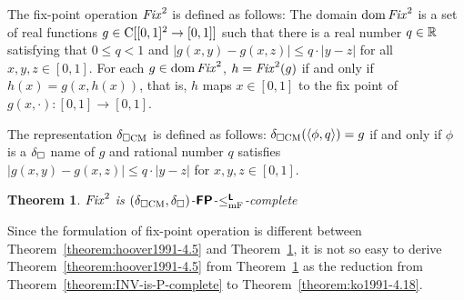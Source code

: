 \documentclass{article}
\newtheorem{theorem}{Theorem}[section]
\theoremstyle{definition}
\theoremstyle{remark}
\begin{document}
The fix-point operation $\mathit{Fix}^2$ is defined as follows:
The domain $\mathop{\rm dom} \mathit{Fix}^2$ is a set of real functions 
$g \in \mathrm C[[0,1]^2 \to [0,1]]$ such that there is a real number $q \in \mathbb R$
satisfying that $0 \le q < 1$ and $|g(x, y) - g(x, z)| \le q \cdot |y - z|$
for all $x, y, z \in [0,1]$.
For each $g \in \mathop{\rm dom} \mathit{Fix}^2$, $h = \mathit{Fix}^2(g)$ if and only if 
$h(x) = g(x, h(x))$, that is, $h$ maps $x \in [0,1]$ to the fix point of $g(x, \cdot) \colon [0,1] \to [0,1]$.

The representation $\delta _{\square \mathrm{CM}}$ is defined as follows:
$\delta _{\square \mathrm{CM}}(\langle \phi, q \rangle) = g$ if and only if
$\phi$ is a $\delta _\square$ name of $g$ and rational number $q$ satisfies 
$|g(x, y) - g(x, z)| \le q \cdot |y - z|$ for  $x, y, z \in [0,1]$.

\begin{theorem}
 \label{theorem:Fix-is-P-complete}
 $\mathit{Fix}^2$ is $(\delta _{\square \mathrm{CM}}, \delta _\square)$-$\text{\bfseries \sffamily \upshape FP}$-$\leq _{\mathrm{mF}} ^{\text{\bfseries \sffamily \upshape L}}$-complete
\end{theorem}


Since the formulation of fix-point operation is different between 
Theorem~\ref{theorem:hoover1991-4.5} and Theorem~\ref{theorem:Fix-is-P-complete},
it is not so easy to derive Theorem~\ref{theorem:hoover1991-4.5} from
Theorem~\ref{theorem:Fix-is-P-complete} as the reduction from 
Theorem~\ref{theorem:INV-is-P-complete} to Theorem~\ref{theorem:ko1991-4.18}.
\end{document}
